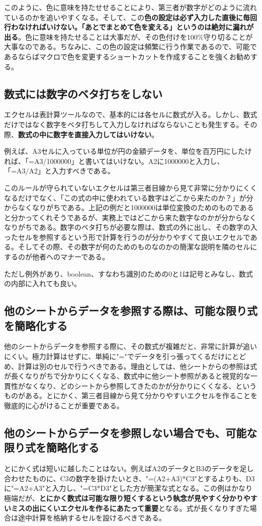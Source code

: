 \documentclass[dvipdfmx]{jsarticle}
\begin{document}
このように、色に意味を持たせせることにより、第三者が数字がどのように流れているのかを追いやすくなる。そして、この\textbf{色の設定は必ず入力した直後に毎回行わなければいけない。「あとでまとめて色を変える」というのは絶対に漏れが出る}。色に意味を持たせることは大事だが、その色付けを100\%守り切ることが大事なのである。ちなみに、この色の設定は頻繁に行う作業であるので、可能であるならばマクロで色を変更するショートカットを作成することを強くお勧めする。

\subsection{数式には数字のベタ打ちをしない}
エクセルは表計算ツールなので、基本的には各セルに数式が入る。しかし、数式だけではなく数字をベタ打ちして入力しなければならないことも発生する。その際、\textbf{数式の中に数字を直接入力してはいけない}。

例えば、A3セルに入っている単位が円の金額データを、単位を百万円にしたければ、「=A3/1000000」と書いてはいけない。A2に1000000と入力し、「=A3/A2」と入力すべきである。

このルールが守られていないエクセルは第三者目線から見て非常に分かりにくくなるだけでなく、「この式の中に使われている数字はどこから来たのか？」が分からなくなりがちである。上記の例だと1000000は単位変換のためのものであると分かってくれそうであるが、実務上ではどこから来た数字なのかが分からなくなりがちである。数字のベタ打ちが必要な際は、数式の外に出し、その数字の入ったセルを参照するという形で計算を行うのが分かりやすくて良いエクセルである。そしてその際、その数字が何のためのものなのかの簡潔な説明を隣のセルにするのが他者へのマナーである。

ただし例外があり、boolean、すなわち識別のための0と1は記号とみなし、数式の内部に入れても良い。

\subsection{他のシートからデータを参照する際は、可能な限り式を簡略化する}
他のシートからデータを参照する際に、その数式が複雑だと、非常に計算が追いにくい。極力計算はせずに、単純に"="でデータを引っ張ってくるだけにとどめ、計算は別のセルで行うべきである。理由としては、他シートからの参照は式が長くなりがちで分かりにくくなる、数式中に他シート参照があると視覚的な一貫性がなくなり、どのシートから参照してきたのかが分かりにくくなる、というものがある。とにかく、第三者目線から見て分かりやすいエクセルを作ることを徹底的に心がけることが重要である。

\subsection{他のシートからデータを参照しない場合でも、可能な限り式を簡略化する}
とにかく式は短いに越したことはない。例えばA2のデータとB3のデータを足し合わせたものに、C3の数字を掛けたいとき、"=(A2+A3)*C3"とするよりも、D3に"=A2+A3"と入力し、"=C3*D3"とした方が簡潔な式となる。この例はかなり極端だが、\textbf{とにかく数式は可能な限り短くするという執念が見やすく分かりやすいミスの出にくいエクセルを作るにあたって重要}となる。式が長くなりすぎた場合は途中計算を格納するセルを設けるべきである。
\end{document}

